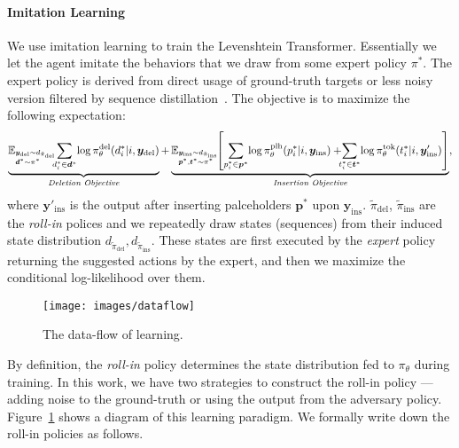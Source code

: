 \documentclass{article}
\begin{document}
\paragraph{Imitation Learning} 
We use imitation learning to train the Levenshtein Transformer. Essentially we let the agent imitate the behaviors that we draw from some expert policy $\pi^*$. The expert policy is derived from direct usage of ground-truth targets or less noisy version filtered by sequence distillation~\citep{kim2016sequence}. The objective is to maximize the following expectation:
\begin{equation*}
\begin{split}
\underbrace{
        \mathbb{E}_{\small\begin{subarray}{l}\bm{y}_\textrm{del} \sim d_{\tilde{\pi}_\textrm{del}}\\\bm{d}^*\sim \pi^*\end{subarray}}\!\!\!
        \sum_{d^*_i \in \bm{d}^*}\!\log \pi_\theta^{\mathrm{del}}(d^*_i|i, \bm{y}_\textrm{del})}_{\textit{Deletion Objective}} + 
      \underbrace{
      \mathbb{E}_{\small\begin{subarray}{l}\bm{y}_\textrm{ins} \sim d_{\tilde{\pi}_\textrm{ins}}\\\bm{p}^*, \bm{t}^*\sim \pi^*\end{subarray}}\!\!
        \left[\sum_{p^*_i \in \bm{p}^*}\!\log \pi_\theta^{\mathrm{plh}}(p^*_i |i, \bm{y}_\textrm{ins}) + \!\!\!
        \sum_{t^*_i \in \bm{t}^*}\!\log \pi_\theta^{\mathrm{tok}}(t^*_i |i, \bm{y}'_\textrm{ins})\right]}_{\textit{Insertion Objective}},
\end{split}
\end{equation*}
where $\bm{y}'_\textrm{ins}$ is the output after inserting palceholders $\bm{p}^*$ upon  $\bm{y}_\textrm{ins}$.
$\tilde{\pi}_\textrm{del}$, $\tilde{\pi}_\textrm{ins}$ are the \textit{roll-in} polices and we repeatedly draw states (sequences) from their induced state distribution $d_{\tilde{\pi}_\textrm{del}}, d_{\tilde{\pi}_\textrm{ins}}$. These states are first executed by the \textit{expert} policy returning the suggested actions by the expert, and then we maximize the conditional log-likelihood over them.
\begin{figure}[htpb]\centering
    \texttt{[image: images/dataflow]}
    \caption{\label{fig.dataflow}The data-flow of learning.}
\end{figure}
By definition, the \textit{roll-in} policy determines the state distribution fed to $\pi_\theta$ during training.
In this work, we have two strategies to construct the roll-in policy --- adding noise to the ground-truth or using the output from the adversary policy. Figure~\ref{fig.dataflow} shows a diagram of this learning paradigm.
We formally write down the roll-in policies as follows.
\end{document}
